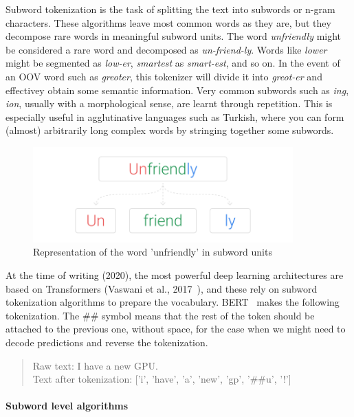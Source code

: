 Subword tokenization is the task of splitting the text into subwords or n-gram characters. These algorithms leave most common words as they are, but they decompose rare words in meaningful subword units. The word \emph{unfriendly} might be considered a rare word and decomposed as \emph{un-friend-ly}. Words like \emph{lower} might be segmented as \emph{low-er}, \emph{smartest} as \emph{smart-est}, and so on. In the event of an OOV word such as \emph{greoter}, this tokenizer will divide it into \emph{greot-er} and effectivey obtain some semantic information. Very common subwords such as \emph{ing}, \emph{ion}, usually with a morphological sense, are learnt through repetition. This is especially useful in agglutinative languages such as Turkish, where you can form (almost) arbitrarily long complex words by stringing together some subwords.

\begin{figure}[!ht]
    \centering
    \includegraphics[width=10cm]{figures/subword.png}
    \caption{Representation of the word 'unfriendly' in subword units}
\end{figure}

At the time of writing (2020), the most powerful deep learning architectures are based on Transformers (Vaswani et al., 2017~\cite{vaswani2017attention}), and these rely on subword tokenization algorithms to prepare the vocabulary. BERT~\cite{devlin2018bert} makes the following tokenization. The \#\# symbol means that the rest of the token should be attached to the previous one, without space, for the case when we might need to decode predictions and reverse the tokenization.

\begin{quote}
    Raw text: I have a new GPU.\\
    Text after tokenization: ['i', 'have', 'a', 'new', 'gp', '\#\#u', '!']
\end{quote}

\paragraph{Subword level algorithms}

